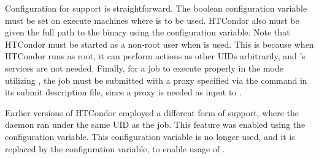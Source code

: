Configuration for  support is straightforward. 
The boolean configuration variable  
must be set  on execute machines where  is to be used.
HTCondor also must be given the full path
to the  binary using the  configuration variable.
Note that HTCondor must be started as a non-root user when  is used.
This is because when HTCondor runs as root,
it can perform actions as other UIDs arbitrarily,
and 's services are not needed.
Finally, for a job to execute
properly in the mode utilizing ,
the job must be submitted with a proxy
specified via the  command in
its submit description file,
since a proxy is needed as input to .

Earlier versions of HTCondor employed a different form of 
support, where the  daemon ran under the same UID as the job.
This feature was enabled using 
the  configuration variable.
This configuration variable is no longer used,
and it is replaced by the  configuration variable,
to enable usage of .

